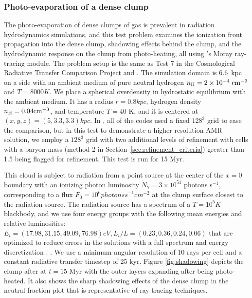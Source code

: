 \subsubsection{Photo-evaporation of a dense clump}
\label{sec.tests.raytracing}

The photo-evaporation of dense clumps of gas is prevalent in radiation
hydrodynamics simulations, and this test problem examines the
ionization front propagation into the dense clump, shadowing effects
behind the clump, and the hydrodynamic response on the clump from
photo-heating, all using \enzo's Moray ray-tracing module.  The
problem setup is the same as Test 7 in the Cosmological Radiative
Transfer Comparison Project \citep{IlievEtAl2009} and
\citet{Wise11_Moray}.  The simulation domain is 6.6~kpc on a side with
an ambient medium of pure neutral hydrogen $n_{\rm H} = 2 \times
10^{-4}\; \cubecm$ and $T = 8000 \unit{K}$.  We place a spherical
overdensity in hydrostatic equilibrium with the ambient medium.  It
has a radius $r = 0.8 \unit{kpc}$, hydrogen density $n_{\rm H} = 0.04
\cubecm$, and temperature $T = 40$ K, and it is centered at $(x,y,z) =
(5, 3.3, 3.3) \unit{kpc}$.  In \citet{IlievEtAl2009}, all of the codes
used a fixed $128^3$ grid to ease the comparison, but in this test to
demonstrate a higher resolution AMR solution, we employ a $128^3$ grid
with two additional levels of refinement with cells with a baryon mass
(method 2 in Section~\ref{sec:refinement_criteria}) greater than 1.5
being flagged for refinement.  This test is run for 15 Myr.

This cloud is subject to radiation from a point source at the center
of the $x=0$ boundary with an ionizing photon luminosity
$\dot{N}_\gamma = 3 \times 10^{51}$ photons s$^{-1}$, corresponding to
a flux $F_0 = 10^6 \unit{photons s}^{-1} \unit{cm}^{-2}$ at the clump
surface closest to the radiation source.  The radiation source has a
spectrum of a $T = 10^5 \unit{K}$ blackbody, and we use four energy
groups with the following mean energies and relative luminosities:
$E_i = (17.98, 31.15, 49.09, 76.98) \unit{eV}, L_i/L = (0.23, 0.36,
0.24, 0.06)$ that are optimized to reduce errors in the solutions with
a full spectrum and energy discretization \citep{Mirocha12}.
\citep[Note that this choice of energy groups is different
from][]{Wise11_Moray}.  We use a minimum angular resolution of 10 rays
per cell and a constant radiative transfer timestep of 25 kyr.  Figure
\ref{fig:shadowing} depicts the clump after at $t = 15$ Myr with the
outer layers expanding after being photo-heated.  It also shows the
sharp shadowing effects of the dense clump in the neutral fraction
plot that is representative of ray tracing techniques.

